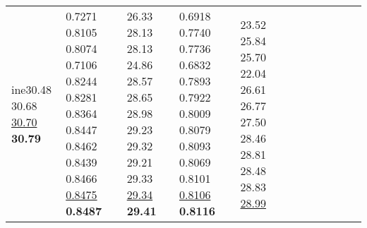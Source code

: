 \documentclass[runningheads]{llncs}
\begin{document}
\begin{table}[t]
\begin{tabular}{|p{6.5em}|p{2.5em}|p{2.5em}|p{3em}|p{2.5em}|p{3em}|p{2.5em}|p{3em}|p{2.5em}|p{3em}|p{2.5em}|p{3em}|}
ine{}30.48 \newline{}30.68 \newline{}\underline{30.70} \newline{}\bfseries{30.79}& 0.7271 \newline{}0.8105 \newline{}0.8074 \newline{}0.7106 \newline{}0.8244 \newline{}0.8281 \newline{}0.8364 \newline{}0.8447 \newline{}0.8462 \newline{}0.8439 \newline{}0.8466 \newline{}\underline{0.8475} \newline{}\bfseries{0.8487} & 26.33 \newline{}28.13 \newline{}28.13 \newline{}24.86 \newline{}28.57 \newline{}28.65 \newline{}28.98 \newline{}29.23 \newline{}29.32 \newline{}29.21 \newline{}29.33 \newline{}\underline{29.34} \newline{}\bfseries{29.41} & 0.6918 \newline{}0.7740 \newline{}0.7736 \newline{}0.6832 \newline{}0.7893 \newline{}0.7922 \newline{}0.8009 \newline{}0.8079 \newline{}0.8093 \newline{}0.8069 \newline{}0.8101 \newline{}\underline{0.8106} \newline{}\bfseries{0.8116}& 23.52 \newline{}25.84 \newline{}25.70 \newline{}22.04 \newline{}26.61 \newline{}26.77 \newline{}27.50 \newline{}28.46 \newline{}28.81 \newline{}28.48 \newline{}28.83 \newline{}\underline{28.99} 
\end{tabular}
\end{table}
\end{document}
